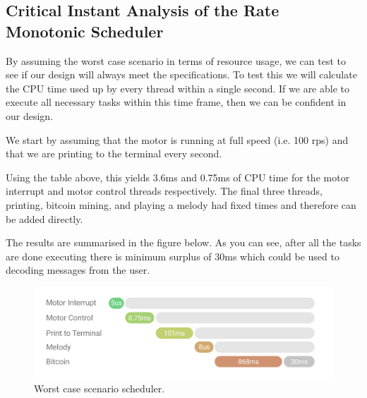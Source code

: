 \documentclass{article}
\begin{document}
\subsection{Critical Instant Analysis of the Rate Monotonic Scheduler}

\noindent
By assuming the worst case scenario in terms of resource usage, we can test to see if our design will always meet the specifications.
To test this we will calculate the CPU time used up by every thread within a single second. If we are able to execute all necessary tasks within this time frame, then we can be confident in our design.

\bigskip

\noindent
We start by assuming that the motor is running at full speed (i.e. 100 rps) and that we are printing to the terminal every second.

\bigskip

\noindent
Using the table above, this yields 3.6ms and 0.75ms of CPU time for the motor interrupt and motor control threads respectively.
The final three threads, printing, bitcoin mining, and playing a melody had fixed times and therefore can be added directly.

\bigskip

\noindent
The results are summarised in the figure below. As you can see, after all the tasks are done executing there is minimum surplus of 30ms which could be used to decoding messages from the user.


\begin{figure}[H]
\begin{center}
   \includegraphics[width=0.9\linewidth]{scheduler.png}
\end{center}
   \caption{Worst case scenario scheduler.}
\label{fig:long}
\label{fig:onecol}
\end{figure}
\end{document}

